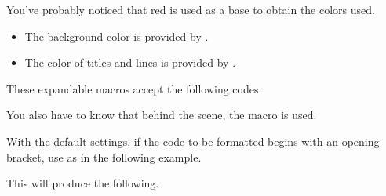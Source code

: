 \documentclass[12pt, a4paper]{tutodoc}
\begin{document}
\begin{tdocnote}
    You've probably noticed that red is used as a base to obtain the colors used.

    \begin{itemize}
    	\item The background color is provided by .

    	\item The color of titles and lines is provided by .
    \end{itemize}

    These expandable macros accept the following codes.

    \begin{tdoclatex}[code]

    \end{tdoclatex}

    You also have to know that behind the scene, the  macro is used.

    \begin{tdoclatex}[std]
    \end{tdoclatex}
\end{tdocnote}




\begin{tdocwarn}
    With the default settings, if the code to be formatted begins with an opening bracket, use  as in the following example.


    This will produce the following.
\end{tdocwarn}



\end{document}
